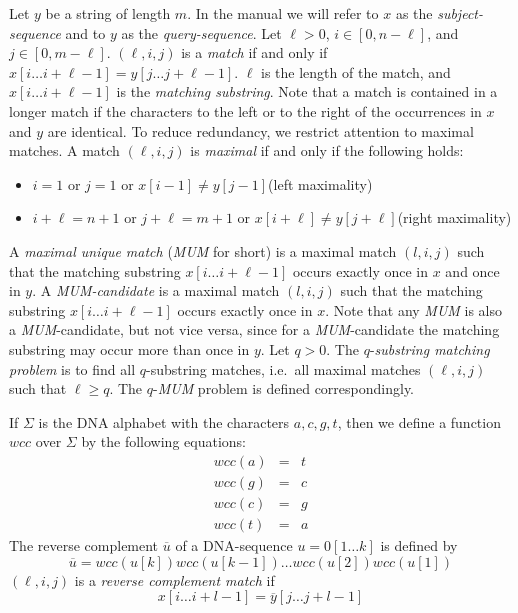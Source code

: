 \documentclass[12pt]{article}
\newcommand{\MUM}[0]{\textit{MUM}\xspace}
\newcommand{\Subs}[3]{#1[#2\ldots#3]}
\newcommand{\Match}[3]{(#3,#1,#2)}
\begin{document}
Let \(y\) be a string of length \(m\). In the manual we will refer to
\(x\) as the \emph{subject-sequence} and to \(y\) as the \emph{query-sequence}.
Let \(\ell>0\), \(i\in[0,n-\ell]\), and \(j\in[0,m-\ell]\).
\(\Match{i}{j}{\ell}\) is a \emph{match} if and only if
\(\Subs{x}{i}{i+\ell-1}=\Subs{y}{j}{j+\ell-1}\).
\(\ell\) is the length of the match, and \(\Subs{x}{i}{i+\ell-1}\)
is the \emph{matching substring}. Note that a match is contained in a 
longer match if the characters to the left or to the right of the 
occurrences in \(x\) and \(y\) are identical. To reduce redundancy, we restrict
attention to maximal matches.
A match \(\Match{i}{j}{\ell}\) is \emph{maximal} if and only if the following 
holds:
\begin{itemize}
\item
\(i=1\) or \(j=1\) or \(x[i-1]\neq y[j-1]\)\hfill(left maximality)
\item
\(i+\ell=n+1\) or \(j+\ell=m+1\) or \(x[i+\ell]\neq 
y[j+\ell]\)\hfill(right maximality)
\end{itemize}
A \emph{maximal unique match} (\MUM for short) is a maximal match 
\(\Match{i}{j}{l}\) such that the matching substring \(\Subs{x}{i}{i+\ell-1}\)
occurs exactly once in \(x\) and once in \(y\). A \emph{\MUM-candidate} 
is a maximal match \(\Match{i}{j}{l}\) such that the matching substring 
\(\Subs{x}{i}{i+\ell-1}\) occurs exactly once in \(x\). Note that 
any \MUM is also a \MUM-candidate, but not vice versa, since for a
\MUM-candidate the matching substring may occur more than once in \(y\).
Let \(q>0\). The $q$-\emph{substring matching problem}
is to find all \(q\)-substring matches, i.e.\ all
maximal matches \(\Match{i}{j}{\ell}\) such that \(\ell\geq q\).
The $q$-\MUM problem is defined correspondingly.

If \(\Sigma\) is the DNA alphabet with the characters \(a,c,g,t\), then we 
define a function \(wcc\) over \(\Sigma\) by the following equations:
\begin{eqnarray*}
wcc(a)&=&t\\
wcc(g)&=&c\\
wcc(c)&=&g\\
wcc(t)&=&a
\end{eqnarray*}
The reverse complement \(\overline{u}\) of 
a DNA-sequence \(u=\Subs{0}{1}{k}\) is defined by
\[\overline{u}=wcc(u[k])wcc(u[k-1])\ldots wcc(u[2])wcc(u[1])\]
\(\Match{i}{j}{\ell}\) is a \emph{reverse complement match} if
\begin{equation}
\Subs{x}{i}{i+l-1}=\Subs{\overline{y}}{j}{j+l-1}\label{RCcondition}
\end{equation}
\end{document}
